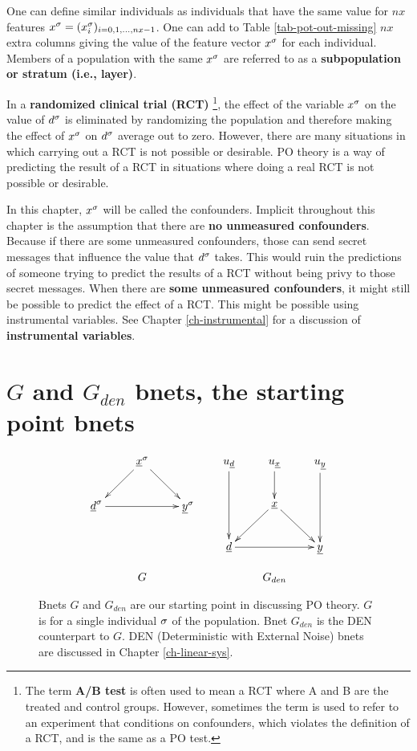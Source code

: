 One can define
similar
individuals as 
individuals that have the same
value
for $nx$ features $x^\sigma=(x^\sigma_i)_{i=0, 1, \ldots, nx-1}$.
One
can add to Table \ref{tab-pot-out-missing}
 $nx$ extra columns
giving the value of
the feature vector $x^\sigma$
for each individual.
Members
of a population with
the same $x^\sigma$ 
are referred to as 
a
{\bf subpopulation or stratum (i.e., layer)}.

In a {\bf randomized clinical trial (RCT)}
\footnote{The term {\bf A/B test}
is often used to mean a RCT
where A and B are the treated and control groups. However,
sometimes the term is used to refer to 
an experiment  that conditions on confounders,
which violates the definition of a RCT,
and is the same as a PO test.},
the effect 
of the variable $x^\sigma$ on 
the value
of $d^\sigma$
is eliminated by
randomizing
the population
and therefore
making the effect of $x^\sigma$
on $d^\sigma$
average out  to zero.
However,
there are many situations
in which carrying out a RCT is not
possible
or desirable. PO theory is
a way of predicting the
result
of a RCT in situations where
doing a real RCT is not possible
or desirable.

In this chapter, $x^\sigma$
will be called the confounders.
Implicit throughout this chapter
is the assumption that there are {\bf 
no unmeasured confounders}.
Because if 
there are some unmeasured confounders,
those can
send secret messages 
that influence the value 
that $d^\sigma$ takes.
This would ruin
the
predictions
of someone trying
to predict the results of a RCT
without
being privy to those secret 
messages.
When there are {\bf some
unmeasured confounders},
it might still be
possible
to
predict the effect of a RCT.
This might be possible
using instrumental variables. See Chapter
\ref{ch-instrumental}
for a discussion
of {\bf instrumental
variables}.


\section{$G$ and $G_{den}$
bnets,
the starting point bnets}


\begin{figure}[h!]
$$
\begin{array}{ccc}
\xymatrix{
&\rvx^\s\ar[dl]\ar[dr]
\\
\rvd^\s\ar[rr]&&\rvy^\s
}
&&
\xymatrix{
u_\rvd\ar[dd]&u_\rvx\ar[d]&u_\rvy\ar[dd]
\\
&\rvx\ar[dl]\ar[dr]
\\
\rvd\ar[rr]&&\rvy
}
\\
\\
G&&G_{den}
\end{array}
$$
\caption{Bnets
$G$ and $G_{den}$
are 
our starting
point in discussing PO theory. 
 $G$ is for 
a single individual $\sigma$ of the 
population.
Bnet $G_{den}$ is the 
DEN counterpart 
to $G$.
DEN (Deterministic with
External Noise) bnets are discussed in Chapter
\ref{ch-linear-sys}.} 
\label{fig-po-G-start}
\end{figure}

